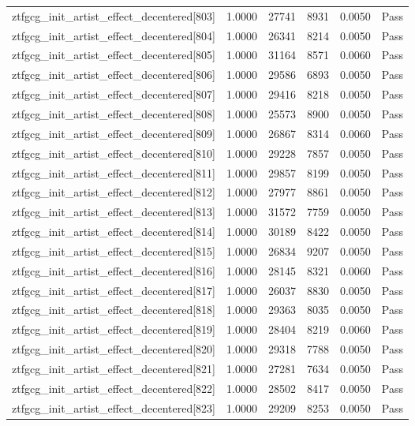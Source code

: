 \begin{table}[htbp]
\begin{tabular}{llrrll}
ztfgcg\_init\_artist\_effect\_decentered[803] & 1.0000 & 27741 & 8931 & 0.0050 & Pass \\
ztfgcg\_init\_artist\_effect\_decentered[804] & 1.0000 & 26341 & 8214 & 0.0050 & Pass \\
ztfgcg\_init\_artist\_effect\_decentered[805] & 1.0000 & 31164 & 8571 & 0.0060 & Pass \\
ztfgcg\_init\_artist\_effect\_decentered[806] & 1.0000 & 29586 & 6893 & 0.0050 & Pass \\
ztfgcg\_init\_artist\_effect\_decentered[807] & 1.0000 & 29416 & 8218 & 0.0050 & Pass \\
ztfgcg\_init\_artist\_effect\_decentered[808] & 1.0000 & 25573 & 8900 & 0.0050 & Pass \\
ztfgcg\_init\_artist\_effect\_decentered[809] & 1.0000 & 26867 & 8314 & 0.0060 & Pass \\
ztfgcg\_init\_artist\_effect\_decentered[810] & 1.0000 & 29228 & 7857 & 0.0050 & Pass \\
ztfgcg\_init\_artist\_effect\_decentered[811] & 1.0000 & 29857 & 8199 & 0.0050 & Pass \\
ztfgcg\_init\_artist\_effect\_decentered[812] & 1.0000 & 27977 & 8861 & 0.0050 & Pass \\
ztfgcg\_init\_artist\_effect\_decentered[813] & 1.0000 & 31572 & 7759 & 0.0050 & Pass \\
ztfgcg\_init\_artist\_effect\_decentered[814] & 1.0000 & 30189 & 8422 & 0.0050 & Pass \\
ztfgcg\_init\_artist\_effect\_decentered[815] & 1.0000 & 26834 & 9207 & 0.0050 & Pass \\
ztfgcg\_init\_artist\_effect\_decentered[816] & 1.0000 & 28145 & 8321 & 0.0060 & Pass \\
ztfgcg\_init\_artist\_effect\_decentered[817] & 1.0000 & 26037 & 8830 & 0.0050 & Pass \\
ztfgcg\_init\_artist\_effect\_decentered[818] & 1.0000 & 29363 & 8035 & 0.0050 & Pass \\
ztfgcg\_init\_artist\_effect\_decentered[819] & 1.0000 & 28404 & 8219 & 0.0060 & Pass \\
ztfgcg\_init\_artist\_effect\_decentered[820] & 1.0000 & 29318 & 7788 & 0.0050 & Pass \\
ztfgcg\_init\_artist\_effect\_decentered[821] & 1.0000 & 27281 & 7634 & 0.0050 & Pass \\
ztfgcg\_init\_artist\_effect\_decentered[822] & 1.0000 & 28502 & 8417 & 0.0050 & Pass \\
ztfgcg\_init\_artist\_effect\_decentered[823] & 1.0000 & 29209 & 8253 & 0.0050 & Pass \\

\end{tabular}
\end{table}
